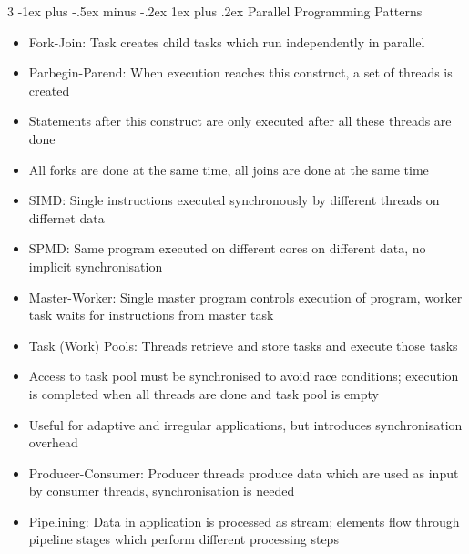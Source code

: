 \documentclass[10pt, landscape]{article}
\makeatletter
\renewcommand{\subsection}{\@startsection{subsection}{3}{0mm}%
                                {-1ex plus -.5ex minus -.2ex}%
                                {1ex plus .2ex}%
                                {\normalfont\small\bfseries}}%
\makeatother
\begin{document}
\begin{multicols*}{3}
\subsection{Parallel Programming Patterns}
\begin{itemize}
    \item Fork-Join: Task creates child tasks which run independently in parallel
    \item Parbegin-Parend: When execution reaches this construct, a set of threads is created
    \item Statements after this construct are only executed after all these threads are done
    \item All forks are done at the same time, all joins are done at the same time
    \item SIMD: Single instructions executed synchronously by different threads on differnet data
    \item SPMD: Same program executed on different cores on different data, no implicit synchronisation
    \item Master-Worker: Single master program controls execution of program, worker task waits for instructions from master task
    \item Task (Work) Pools: Threads retrieve and store tasks and execute those tasks
    \item Access to task pool must be synchronised to avoid race conditions; execution is completed when all threads are done and task pool is empty
    \item Useful for adaptive and irregular applications, but introduces synchronisation overhead
    \item Producer-Consumer: Producer threads produce data which are used as input by consumer threads, synchronisation is needed
    \item Pipelining: Data in application is processed as stream; elements flow through pipeline stages which perform different processing steps
\end{itemize}


\end{multicols*}
\end{document}
